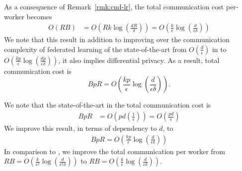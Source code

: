 \begin{corollary}
As a consequence of Remark~\ref{rmk:cnd-lr}, the total communication cost per-worker becomes \begin{align}
O\left(RB\right)&=O\left(Rk\log \left(\frac{d R}{\delta}\right)\right)=O\left(\frac{k }{\epsilon}\log \left(\frac{d }{\epsilon\delta}\right)\right)
\end{align}
We note that this result in addition to improving over the communication complexity of federated learning of the state-of-the-art from $O\left(\frac{d}{\epsilon}\right)$ in \cite{karimireddy2019scaffold,wang2018cooperative,liang2019variance} to $O\left(\frac{k p}{\epsilon}\log \left(\frac{d p}{\epsilon\delta}\right)\right)$, it also implies differential privacy. As a result, total communication cost is 
$$BpR=O\left(\frac{k p}{\epsilon}\log \left(\frac{d }{\epsilon\delta}\right)\right).$$ 
\end{corollary}

\begin{remark}
We note that the state-of-the-art in \cite{karimireddy2019scaffold} the total communication cost is 
\begin{align}
    BpR&=O\left(pd\left(\frac{1}{\epsilon}\right) \right)=O\left(\frac{pd}{\epsilon}\right) 
\end{align}
We improve this result, in terms of dependency to $d$, to 
\begin{align}
    BpR=O\left(\frac{k p}{\epsilon}\log \left(\frac{d }{\epsilon\delta}\right)\right)
\end{align}
In comparison to \cite{ivkin2019communication}, we improve the total communication per worker from $RB=O\left(\frac{k }{\epsilon^2}\log \left(\frac{d }{\epsilon^2\delta}\right)\right)$ to $RB=O\left(\frac{k }{\epsilon}\log \left(\frac{d }{\epsilon\delta}\right)\right)$.

\end{remark}

